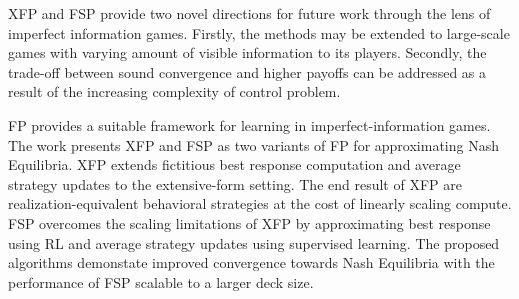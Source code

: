 \documentclass[11pt,letterpaper]{article}
\begin{document}
XFP and FSP provide two novel directions for future work through the lens of imperfect information games. Firstly, the methods may be extended to large-scale games with varying amount of visible information to its players. Secondly, the trade-off between sound convergence and higher payoffs can be addressed as a result of the increasing complexity of control problem. 

FP provides a suitable framework for learning in imperfect-information games. The work presents XFP and FSP as two variants of FP for approximating Nash Equilibria. XFP extends fictitious best response computation and average strategy updates to the extensive-form setting. The end result of XFP are realization-equivalent behavioral strategies at the cost of linearly scaling compute. FSP overcomes the scaling limitations of XFP by approximating best response using RL and average strategy updates using supervised learning. The proposed algorithms demonstate improved convergence towards Nash Equilibria with the performance of FSP scalable to a larger deck size. 
\end{document}
